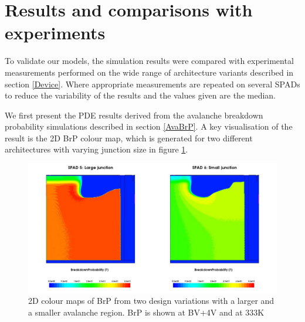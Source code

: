 \documentclass[10pt,a4paper,twocolumn]{article}
\begin{document}
\section{Results and comparisons with experiments}


To validate our models, the simulation results were compared with experimental measurements performed on the wide range of architecture variants described in section \ref{Device}. Where appropriate measurements are repeated on several SPADs to reduce the variability of the results and the values given are the median. 

We first present the PDE results derived from the avalanche breakdown probability simulations described in section \ref{AvaBrP}. A key visualisation of the result is the 2D BrP colour map, which is generated for two different architectures with varying junction size in figure \ref{fig:BrP2DHeatMap}.
\begin{figure}[h!]
\centering
\includegraphics[width=0.9\linewidth]{../pictures/PPVariationNoAxesHorizontalLegend2.jpg}
\caption{2D colour maps of BrP from two design variations with a larger and a smaller avalanche region. BrP is shown at BV+4V and at 333K}
\label{fig:BrP2DHeatMap}
\end{figure}
\end{document}
